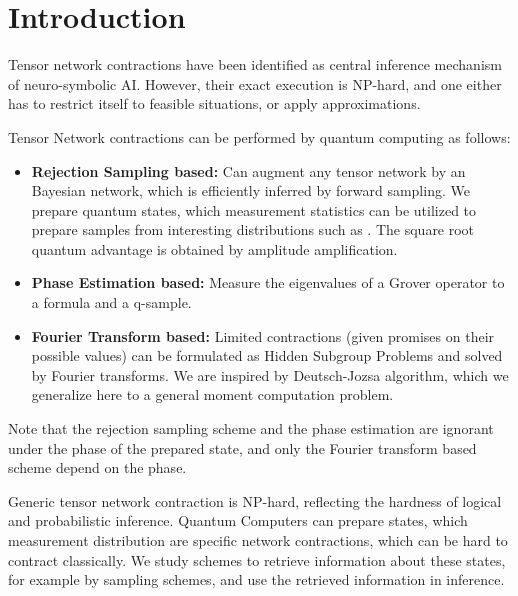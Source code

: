 \section{Introduction}




Tensor network contractions have been identified as central inference mechanism of neuro-symbolic AI.
However, their exact execution is $\mathrm{NP}$-hard, and one either has to restrict itself to feasible situations, or apply approximations.


Tensor Network contractions can be performed by quantum computing as follows:
\begin{itemize}
    \item \textbf{Rejection Sampling based:}
    Can augment any tensor network by an Bayesian network, which is efficiently inferred by forward sampling.
    We prepare quantum states, which measurement statistics can be utilized to prepare samples from interesting distributions such as \ComputationActivationNetworks{}.
    The square root quantum advantage is obtained by amplitude amplification.
    \item \textbf{Phase Estimation based:}
    Measure the eigenvalues of a Grover operator to a formula and a q-sample.
    \item \textbf{Fourier Transform based:}
    Limited contractions (given promises on their possible values) can be formulated as Hidden Subgroup Problems and solved by Fourier transforms.
    We are inspired by Deutsch-Jozsa algorithm, which we generalize here to a general moment computation problem.
\end{itemize}

%
Note that the rejection sampling scheme and the phase estimation are ignorant under the phase of the prepared state, and only the Fourier transform based scheme depend on the phase.

Generic tensor network contraction is $\mathrm{NP}$-hard, reflecting the hardness of logical and probabilistic inference.
Quantum Computers can prepare states, which measurement distribution are specific network contractions, which can be hard to contract classically.
We study schemes to retrieve information about these states, for example by sampling schemes, and use the retrieved information in inference.

